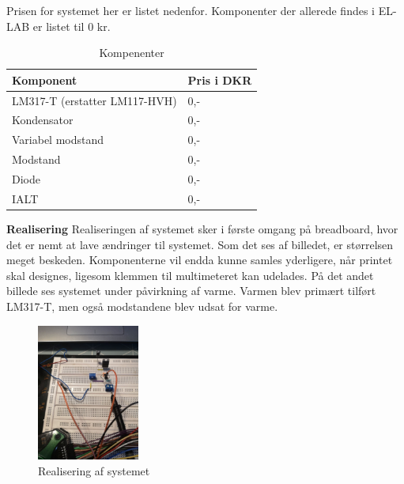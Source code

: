 Prisen for systemet her er listet nedenfor. Komponenter der allerede findes i EL-LAB er listet til 0 kr.
\begin{table}[h]
  \centering
\begin{tabular}{ll}
\hline
Komponent & Pris i DKR \\
\hline
LM317-T (erstatter LM117-HVH) & 0,- \\
\hline
Kondensator & 0,- \\
\hline
Variabel modstand & 0,- \\
\hline
Modstand & 0,- \\
\hline
Diode & 0,- \\
\hline
IALT & 0,- \\
\hline
\end{tabular}
  \caption{Kompenenter}
  \label{tab:komp}
\end{table}

\clearpage
\textbf{Realisering}\newline
Realiseringen af systemet sker i første omgang på breadboard, hvor det er nemt at lave ændringer til systemet. Som det ses af billedet, er størrelsen meget beskeden. Komponenterne vil endda kunne samles yderligere, når printet skal designes, ligesom klemmen til multimeteret kan udelades.
På det andet billede ses systemet under påvirkning af varme. Varmen blev primært tilført LM317-T, men også modstandene blev udsat for varme.

\begin{figure}[h]
  \centering
  \includegraphics[width=0.3\textwidth]{bil2.jpg}
  \caption{Realisering af systemet}
  \label{fig:bil2}
\end{figure}

